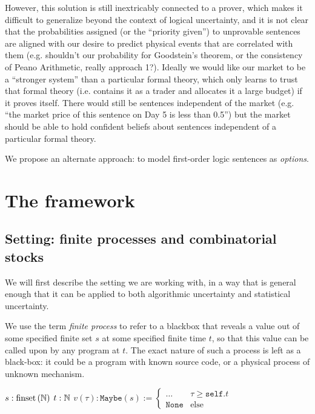\documentclass{article}
\begin{document}
However, this solution is still inextricably connected to a prover, which makes it difficult to generalize beyond the context of logical uncertainty, and it is not clear that the probabilities assigned (or the ``priority given'') to unprovable sentences are aligned with our desire to predict physical events that are correlated with them (e.g. shouldn't our probability for Goodstein's theorem, or the consistency of Peano Arithmetic, really approach 1?). Ideally we would like our market to be a ``stronger system'' than a particular formal theory, which only learns to trust that formal theory (i.e. contains it as a trader and allocates it a large budget) if it proves itself. There would still be sentences independent of the market (e.g. ``the market price of this sentence on Day 5 is less than 0.5'') but the market should be able to hold confident beliefs about sentences independent of a particular formal theory.

We propose an alternate approach: to model first-order logic sentences as \emph{options}. 

\section{The framework}

\subsection{Setting: finite processes and combinatorial stocks}

We will first describe the setting we are working with, in a way that is general enough that it can be applied to both algorithmic uncertainty and statistical uncertainty.

We use the term \emph{finite process} to refer to a blackbox that reveals a value out of some specified finite set $s$ at some specified finite time $t$, so that this value can be called upon by any program at $t$. The exact nature of such a process is left as a black-box: it could be a program with known source code, or a physical process of unknown mechanism. 

\begin{algorithm}
\begin{algorithmic}
    \State {}
        \State $s : \operatorname{finset}\left(\mathbb{N}\right)$ 
        \State $t : \mathbb{N}$ 
        \State $v(\tau) : \mathtt{Maybe}(s) := \begin{cases}\dots & \tau \ge \mathtt{self.}t \\ \mathtt{None} & \mathrm{else}\end{cases}$ 
    \EndClass
\end{algorithmic}
\end{algorithm}
\end{document}
